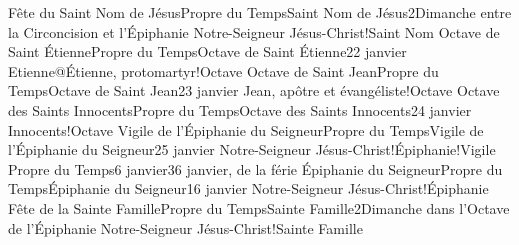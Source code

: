 \documentclass[twoside, french]{book}
\begin{document}
        {Fête du Saint Nom de Jésus}{Propre du Temps}{Saint Nom de Jésus}{2}{Dimanche entre la Circoncision et l’Épiphanie}
        {}{}{Notre-Seigneur Jésus-Christ!Saint Nom}{}{}
        {Octave de Saint Étienne}{Propre du Temps}{Octave de Saint Étienne}{2}{2 janvier}
        {}{}{Etienne@Étienne, protomartyr!Octave}{}{}
        {Octave de Saint Jean}{Propre du Temps}{Octave de Saint Jean}{2}{3 janvier}
        {}{}{Jean, apôtre et évangéliste!Octave}{}{}
        {Octave des Saints Innocents}{Propre du Temps}{Octave des Saints Innocents}{2}{4 janvier}
        {}{}{Innocents!Octave}{}{}
        {Vigile de l’Épiphanie du Seigneur}{Propre du Temps}{Vigile de l’Épiphanie du Seigneur}{2}{5 janvier}
        {}{}{Notre-Seigneur Jésus-Christ!Épiphanie!Vigile}{}{}
        {}{Propre du Temps}{6 janvier}{3}{6 janvier, de la férie}
        {}{}{}{}{}
        {Épiphanie du Seigneur}{Propre du Temps}{Épiphanie du Seigneur}{1}{6 janvier}
        {}{}{Notre-Seigneur Jésus-Christ!Épiphanie}{}{}
        {Fête de la Sainte Famille}{Propre du Temps}{Sainte Famille}{2}{Dimanche dans l’Octave de l’Épiphanie}
        {}{}{Notre-Seigneur Jésus-Christ!Sainte Famille}{}{}
\end{document}

